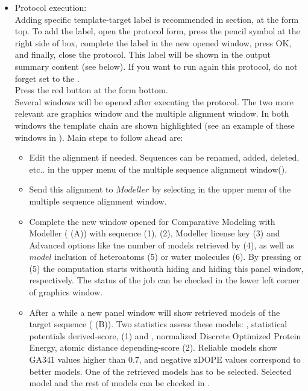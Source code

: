 \begin{itemize}
\begin{itemize}
  \end{itemize}
  \item Protocol execution:\\
  
  Adding specific template-target label is recommended in  section, at the form top. To add the label, open the protocol form, press the pencil symbol at the right side of  box, complete the label in the new opened window, press OK, and finally, close the protocol. This label will be shown in the output summary content (see below). If you want to run again this protocol, do not forget set to  the .\\
  Press the  red button at the form bottom.\\
  Several \chimera windows will be opened after executing the protocol. The two more relevant are \chimera graphics window and the multiple alignment window. In both windows the template chain are shown highlighted (see an example of these windows in ). Main steps to follow ahead are:\\
  \begin{itemize}
   \item Edit the alignment if needed. Sequences can be renamed, added, deleted, etc.. in the upper menu of the multiple sequence alignment window().\\
   \item Send this alignment to $Modeller$ by selecting  in the upper menu of the multiple sequence alignment window.\\ 
   \item Complete the new window opened for Comparative Modeling with Modeller ( (A)) with  sequence (1),  (2), Modeller license key (3) and Advanced options like tne number of models retrieved by \modeller (4), as well as $model$ inclusion of heteroatoms (5) or water molecules (6). By pressing  or  (5) the computation starts withouth hiding and hiding this panel window, respectively. The status of the job can be checked in the lower left corner of \chimera graphics window.\\
   \item After a while a new panel window will show retrieved models of the target sequence ( (B)). Two statistics assess these models: , statistical potentials derived-score, (1) and , normalized Discrete Optimized Protein Energy, atomic distance depending-score (2). Reliable models show GA341 values higher than 0.7, and negative zDOPE values correspond to better models. One of the retrieved models has to be selected. Selected model and the rest of models can be checked in \chimera {}.\\

\end{itemize}
\end{itemize}
